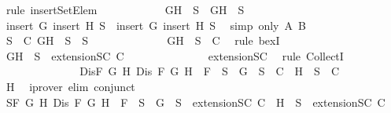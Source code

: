 \begin{isabellebody}
\ {\isacharparenleft}rule\ insertSetElem{\isacharparenright}\isanewline
\ \ \ \ \ \ \ \ \ \ \isamarkupfalse%
\ {\isachardoublequoteopen}{\isacharbraceleft}G{\isacharcomma}H{\isacharbraceright}\ {\isasymunion}\ S{\isacharprime}\ {\isasymsubseteq}\ {\isacharbraceleft}G{\isacharcomma}H{\isacharbraceright}\ {\isasymunion}\ S{\isachardoublequoteclose}\ \isanewline
\ \ \ \ \ \ \ \ \ \ \ \ \isamarkupfalse%
\ {\isacartoucheopen}insert\ G\ {\isacharparenleft}insert\ H\ S{\isacharprime}{\isacharparenright}\ {\isasymsubseteq}\ insert\ G\ {\isacharparenleft}insert\ H\ S{\isacharparenright}{\isacartoucheclose}\ \isamarkupfalse%
\ {\isacharparenleft}simp\ only{\isacharcolon}\ A\ B{\isacharparenright}\isanewline
\ \ \ \ \ \ \ \ \ \ \isamarkupfalse%
\ \isamarkupfalse%
\ {\isachardoublequoteopen}{\isasymexists}S\ {\isasymin}\ C{\isachardot}\ {\isacharbraceleft}G{\isacharcomma}H{\isacharbraceright}\ {\isasymunion}\ S{\isacharprime}\ {\isasymsubseteq}\ S{\isachardoublequoteclose}\isanewline
\ \ \ \ \ \ \ \ \ \ \ \ \isamarkupfalse%
\ {\isacartoucheopen}{\isacharbraceleft}G{\isacharcomma}H{\isacharbraceright}\ {\isasymunion}\ S\ {\isasymin}\ C{\isacartoucheclose}\ \isamarkupfalse%
\ {\isacharparenleft}rule\ bexI{\isacharparenright}\isanewline
\ \ \ \ \ \ \ \ \ \ \isamarkupfalse%
\ {\isachardoublequoteopen}{\isacharbraceleft}G{\isacharcomma}H{\isacharbraceright}\ {\isasymunion}\ S{\isacharprime}\ {\isasymin}\ {\isacharparenleft}extensionSC\ C{\isacharparenright}{\isachardoublequoteclose}\ \isanewline
\ \ \ \ \ \ \ \ \ \ \ \ \isamarkupfalse%
\ extensionSC\ \isamarkupfalse%
\ {\isacharparenleft}rule\ CollectI{\isacharparenright}\isanewline
\ \ \ \ \ \ \ \ \isamarkupfalse%
\isanewline
\ \ \ \ \ \ \isamarkupfalse%
\isanewline
\ \ \ \ \ \ \isamarkupfalse%
\ Dis{\isacharcolon}{\isachardoublequoteopen}{\isasymforall}F\ G\ H{\isachardot}\ Dis\ F\ G\ H\ {\isasymlongrightarrow}\ F\ {\isasymin}\ S\ {\isasymlongrightarrow}\ {\isacharbraceleft}G{\isacharbraceright}\ {\isasymunion}\ S\ {\isasymin}\ C\ {\isasymor}\ {\isacharbraceleft}H{\isacharbraceright}\ {\isasymunion}\ S\ {\isasymin}\ C{\isachardoublequoteclose}\isanewline
\ \ \ \ \ \ \ \ \isamarkupfalse%
\ H\ \isamarkupfalse%
\ {\isacharparenleft}iprover\ elim{\isacharcolon}\ conjunct{}{\isacharparenright}\isanewline
\ \ \ \ \ \ \isamarkupfalse%
\ S{}{\isacharcolon}{\isachardoublequoteopen}{\isasymforall}F\ G\ H{\isachardot}\ Dis\ F\ G\ H\ {\isasymlongrightarrow}\ F\ {\isasymin}\ S{\isacharprime}\ {\isasymlongrightarrow}\ {\isacharbraceleft}G{\isacharbraceright}\ {\isasymunion}\ S{\isacharprime}\ {\isasymin}\ {\isacharparenleft}extensionSC\ C{\isacharparenright}\ {\isasymor}\ {\isacharbraceleft}H{\isacharbraceright}\ {\isasymunion}\ S{\isacharprime}\ {\isasymin}\ {\isacharparenleft}extensionSC\ C{\isacharparenright}{\isachardoublequoteclose}\isanewline

\end{isabellebody}
